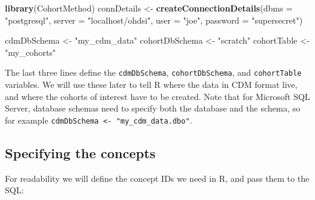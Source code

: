 \documentclass[11pt]{book}
\newenvironment{Shaded}{\begin{snugshade}}{\end{snugshade}}
\newcommand{\DataTypeTok}[1]{\textcolor[rgb]{0.13,0.29,0.53}{#1}}
\newcommand{\KeywordTok}[1]{\textcolor[rgb]{0.13,0.29,0.53}{\textbf{#1}}}
\newcommand{\NormalTok}[1]{#1}
\newcommand{\StringTok}[1]{\textcolor[rgb]{0.31,0.60,0.02}{#1}}
\theoremstyle{definition}
\theoremstyle{definition}
\theoremstyle{definition}
\theoremstyle{remark}
\begin{document}
\begin{Shaded}
\begin{Highlighting}[]
\KeywordTok{library}\NormalTok{(CohortMethod)}
\NormalTok{connDetails <-}\StringTok{ }\KeywordTok{createConnectionDetails}\NormalTok{(}\DataTypeTok{dbms =} \StringTok{"postgresql"}\NormalTok{,}
                                       \DataTypeTok{server =} \StringTok{"localhost/ohdsi"}\NormalTok{,}
                                       \DataTypeTok{user =} \StringTok{"joe"}\NormalTok{,}
                                       \DataTypeTok{password =} \StringTok{"supersecret"}\NormalTok{)}

\NormalTok{cdmDbSchema <-}\StringTok{ "my_cdm_data"}
\NormalTok{cohortDbSchema <-}\StringTok{ "scratch"}
\NormalTok{cohortTable <-}\StringTok{ "my_cohorts"}
\end{Highlighting}
\end{Shaded}

The last three lines define the \texttt{cdmDbSchema}, \texttt{cohortDbSchema}, and \texttt{cohortTable} variables. We will use these later to tell R where the data in CDM format live, and where the cohorts of interest have to be created. Note that for Microsoft SQL Server, database schemas need to specify both the database and the schema, so for example \texttt{cdmDbSchema\ \textless{}-\ "my\_cdm\_data.dbo"}.

\hypertarget{specifying-the-concepts}{%
\subsection{Specifying the concepts}\label{specifying-the-concepts}}

For readability we will define the concept IDs we need in R, and pass them to the SQL:
\end{document}
